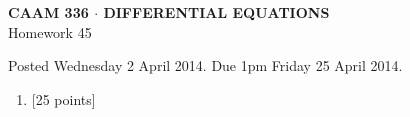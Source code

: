 \documentclass[10pt]{article}
\begin{document}
\vspace*{-5em}
\begin{center}
\large \textsf{\textbf{CAAM 336 $\cdot$ DIFFERENTIAL EQUATIONS}\\[0.5em]
Homework 45 }
\end{center}

Posted Wednesday 2 April 2014.  Due 1pm Friday 25 April 2014.

\begin{enumerate}\addtocounter{enumi}{44}
\item {[25 points]}  
\end{enumerate}
\end{document}
